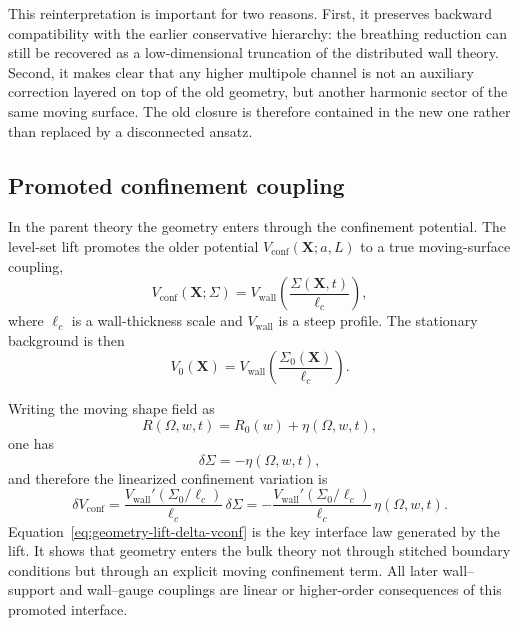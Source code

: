 \documentclass[11pt]{article}
\theoremstyle{definition}
\begin{document}
This reinterpretation is important for two reasons. First, it preserves backward compatibility with the earlier conservative hierarchy: the breathing reduction can still be recovered as a low-dimensional truncation of the distributed wall theory. Second, it makes clear that any higher multipole channel is not an auxiliary correction layered on top of the old geometry, but another harmonic sector of the same moving surface. The old closure is therefore contained in the new one rather than replaced by a disconnected ansatz.

\subsection{Promoted confinement coupling}

In the parent theory the geometry enters through the confinement potential. The level-set lift promotes the older potential $V_{\mathrm{conf}}(\mathbf X;a,L)$ to a true moving-surface coupling,
\begin{equation}
V_{\mathrm{conf}}(\mathbf X;\Sigma)
=
V_{\mathrm{wall}}\!\left(\frac{\Sigma(\mathbf X,t)}{\ell_c}\right),
\label{eq:geometry-lift-vconf}
\end{equation}
where $\ell_c$ is a wall-thickness scale and $V_{\mathrm{wall}}$ is a steep profile. The stationary background is then
\begin{equation}
V_0(\mathbf X)=V_{\mathrm{wall}}\!\left(\frac{\Sigma_0(\mathbf X)}{\ell_c}\right).
\label{eq:geometry-lift-v0}
\end{equation}

Writing the moving shape field as
\begin{equation}
R(\Omega,w,t)=R_0(w)+\eta(\Omega,w,t),
\label{eq:geometry-lift-Reta}
\end{equation}
one has
\begin{equation}
\delta\Sigma = -\eta(\Omega,w,t),
\label{eq:geometry-lift-delta-sigma}
\end{equation}
and therefore the linearized confinement variation is
\begin{equation}
\delta V_{\mathrm{conf}}
=
\frac{V_{\mathrm{wall}}'(\Sigma_0/\ell_c)}{\ell_c}\,\delta\Sigma
=
-\frac{V_{\mathrm{wall}}'(\Sigma_0/\ell_c)}{\ell_c}\,\eta(\Omega,w,t).
\label{eq:geometry-lift-delta-vconf}
\end{equation}
Equation~\eqref{eq:geometry-lift-delta-vconf} is the key interface law generated by the lift. It shows that geometry enters the bulk theory not through stitched boundary conditions but through an explicit moving confinement term. All later wall--support and wall--gauge couplings are linear or higher-order consequences of this promoted interface.
\end{document}
